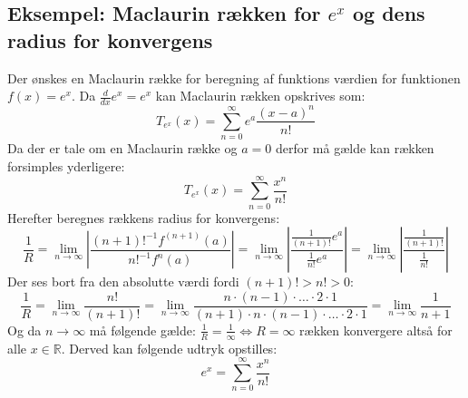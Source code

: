 
\subsection*{\textbf{Eksempel:} Maclaurin rækken for $e^x$ og dens radius for konvergens} 
Der ønskes en Maclaurin række for beregning af funktions værdien for funktionen $f(x) = e^x$.
Da $\frac{d}{dx}e^x = e^x$ kan Maclaurin rækken opskrives som:
\[
T_{e^x}(x) = \sum^\infty_{n = 0} e^a \frac{(x-a)^n}{n!}
\]
Da der er tale om en Maclaurin række og $a = 0$ derfor må gælde kan rækken forsimples yderligere:
\[
T_{e^x}(x) = \sum^\infty_{n = 0} \frac{x^n}{n!}  
\]
Herefter beregnes rækkens radius for konvergens:
\[
    \frac{1}{R} = \lim_{n \rightarrow \infty} \left\lvert \frac{(n + 1)!^{-1}f^{(n+1)}(a)}{n!^{-1}f^n(a)} \right\lvert
    = \lim_{n \rightarrow \infty} \left\lvert \frac{\frac{1}{(n + 1)!}e^a}{\frac{1}{n!}e^a} \right\lvert 
    = \lim_{n \rightarrow \infty} \left\lvert \frac{\frac{1}{(n + 1)!}}{\frac{1}{n!}} \right\lvert
\]
Der ses bort fra den absolutte værdi fordi $(n + 1)! > n! > 0$:
\[
    \frac{1}{R}= \lim_{n \rightarrow \infty} \frac{n!}{(n + 1)!} 
    = \lim_{n \rightarrow \infty} \frac{n \cdot (n-1) \cdot \ldots \cdot 2 \cdot 1}{(n + 1) \cdot n \cdot (n-1) \cdot \ldots \cdot 2 \cdot 1}
    = \lim_{n \rightarrow \infty} \frac{1}{n + 1}
\]
Og da $n \rightarrow \infty$ må følgende gælde: $\frac{1}{R} = \frac{1}{\infty} \Leftrightarrow R = \infty$ rækken konvergere altså for alle $x \in \mathbb{R}$.
Derved kan følgende udtryk opstilles:
\[
e^x = \sum^\infty_{n = 0} \frac{x^n}{n!}  
\]
